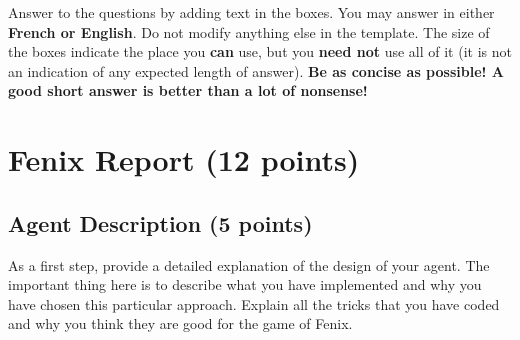 \documentclass[11pt,a4paper]{report}
\begin{document}
\maketitle

Answer to the questions by adding text in the boxes. You may answer in either \textbf{French or English}. Do not modify anything else in the template.  The size of the boxes indicate the place you \textbf{can} use, but you \textbf{need not} use all of it (it is not an indication of any expected length of answer). \textbf{Be as concise as possible! A good short answer is better than a lot of nonsense!}

\section{Fenix Report (12 points)}

\subsection{Agent Description (5 points)}

As a first step, provide a detailed explanation of the design of your agent. The important thing here is to describe what you have implemented and why you have chosen this particular approach. Explain all the tricks that you have coded and why you think they are good for the game of Fenix.
\end{document}
